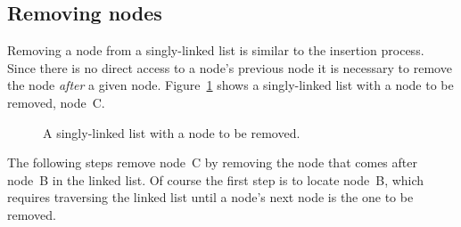 \documentclass{article}
\begin{document}
  \subsection{Removing nodes}
  Removing a node from a singly-linked list is similar to the insertion process. Since there is no direct access to a node's previous node it is necessary to remove the node \emph{after} a given node.
  Figure~\ref{fig:singlelinkedlist-beforeremove} shows a singly-linked list with a node to be removed, node~C.
  \begin{figure}[H]
    \centering
    \caption{A singly-linked list with a node to be removed.}
    \label{fig:singlelinkedlist-beforeremove}
  \end{figure}

  The following steps remove node~C by removing the node that comes after node~B in the linked list. Of course the first step is to locate node~B, which requires traversing the linked list until a node's next node is the one to be removed.
\end{document}
